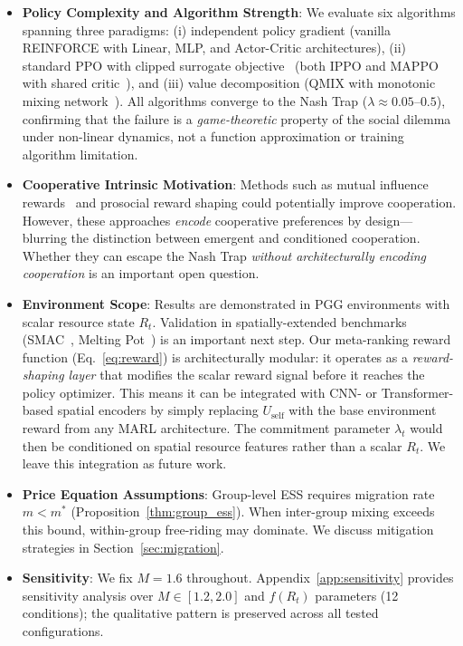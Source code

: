 \documentclass{article}
\begin{document}
\begin{itemize}
    \item \textbf{Policy Complexity and Algorithm Strength}: We evaluate six algorithms spanning three paradigms: (i) independent policy gradient (vanilla REINFORCE with Linear, MLP, and Actor-Critic architectures), (ii) standard PPO with clipped surrogate objective~\citep{schulman2017proximal} (both IPPO and MAPPO with shared critic~\citep{yu2022surprising}), and (iii) value decomposition (QMIX with monotonic mixing network~\citep{rashid2018qmix}).
    All algorithms converge to the Nash Trap ($\lambda \approx 0.05$--$0.5$), confirming that the failure is a \emph{game-theoretic} property of the social dilemma under non-linear dynamics, not a function approximation or training algorithm limitation.
    \item \textbf{Cooperative Intrinsic Motivation}: Methods such as mutual influence rewards~\citep{jaques2019social} and prosocial reward shaping could potentially improve cooperation. However, these approaches \emph{encode} cooperative preferences by design---blurring the distinction between emergent and conditioned cooperation. Whether they can escape the Nash Trap \emph{without architecturally encoding cooperation} is an important open question.
    \item \textbf{Environment Scope}: Results are demonstrated in PGG environments with scalar resource state $R_t$.
    Validation in spatially-extended benchmarks (SMAC~\citep{samvelyan2019starcraft}, Melting Pot~\citep{leibo2021scalable}) is an important next step.
    Our meta-ranking reward function (Eq.~\ref{eq:reward}) is architecturally modular: it operates as a \emph{reward-shaping layer} that modifies the scalar reward signal before it reaches the policy optimizer.
    This means it can be integrated with CNN- or Transformer-based spatial encoders by simply replacing $U_{\text{self}}$ with the base environment reward from any MARL architecture.
    The commitment parameter $\lambda_t$ would then be conditioned on spatial resource features rather than a scalar $R_t$.
    We leave this integration as future work.
    \item \textbf{Price Equation Assumptions}: Group-level ESS requires migration rate $m < m^*$ (Proposition~\ref{thm:group_ess}).
    When inter-group mixing exceeds this bound, within-group free-riding may dominate.
    We discuss mitigation strategies in Section~\ref{sec:migration}.
    \item \textbf{Sensitivity}: We fix $M=1.6$ throughout.
    Appendix~\ref{app:sensitivity} provides sensitivity analysis over $M \in [1.2, 2.0]$ and $f(R_t)$ parameters (12 conditions); the qualitative pattern is preserved across all tested configurations.
\end{itemize}
\end{document}
